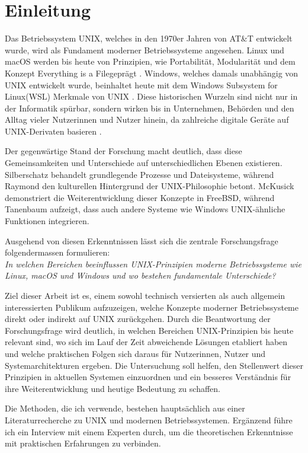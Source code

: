 \section{Einleitung}
Das Betriebssystem UNIX, welches in den 1970er Jahren von AT\&T entwickelt wurde, wird als Fundament moderner Betriebssysteme angesehen. Linux und macOS werden
bis heute von Prinzipien, wie Portabilität, Modularität und dem Konzept \glqq Everything is a File\grqq geprägt \cite{ArtOfUnixProgramming, ModernOS}. Windows,
welches damals unabhängig von UNIX entwickelt wurde, beinhaltet heute mit dem \glqq Windows Subsystem for Linux\grqq (WSL) Merkmale von UNIX \cite{WSL}.
Diese historischen Wurzeln sind nicht nur in der Informatik spürbar, sondern wirken bis in Unternehmen, Behörden und den Alltag vieler Nutzerinnen und Nutzer
hinein, da zahlreiche digitale Geräte auf UNIX-Derivaten basieren \cite{FreeBSDOS, OSConcept}.

Der gegenwärtige Stand der Forschung macht deutlich, dass diese Gemeinsamkeiten und Unterschiede auf unterschiedlichen Ebenen existieren.
Silberschatz \cite{OSConcept} behandelt grundlegende Prozesse und Dateisysteme, während Raymond \cite{ArtOfUnixProgramming} den kulturellen Hintergrund der
UNIX-Philosophie betont.  McKusick \cite{FreeBSDOS} demonstriert die Weiterentwicklung dieser Konzepte in FreeBSD, während Tanenbaum \cite{ModernOS} aufzeigt,
dass auch andere Systeme wie Windows UNIX-ähnliche Funktionen integrieren.

Ausgehend von diesen Erkenntnissen lässt sich die zentrale Forschungsfrage folgendermassen formulieren:\\
\textit{In welchen Bereichen beeinflussen UNIX-Prinzipien moderne Betriebssysteme wie Linux, macOS und Windows und wo bestehen fundamentale Unterschiede?}

Ziel dieser Arbeit ist es, einem sowohl technisch versierten als auch allgemein interessierten Publikum aufzuzeigen, welche Konzepte moderner Betriebssysteme
direkt oder indirekt auf UNIX zurückgehen. Durch die Beantwortung der Forschungsfrage wird deutlich, in welchen Bereichen UNIX-Prinzipien bis heute relevant sind,
wo sich im Lauf der Zeit abweichende Lösungen etabliert haben und welche praktischen Folgen sich daraus für Nutzerinnen, Nutzer und Systemarchitekturen ergeben.
Die Untersuchung soll helfen, den Stellenwert dieser Prinzipien in aktuellen Systemen einzuordnen und ein besseres Verständnis für ihre Weiterentwicklung und
heutige Bedeutung zu schaffen.

Die Methoden, die ich verwende, bestehen hauptsächlich aus einer Literaturrecherche zu UNIX und modernen Betriebssystemen. Ergänzend führe ich ein Interview mit
einem Experten durch, um die theoretischen Erkenntnisse mit praktischen Erfahrungen zu verbinden.